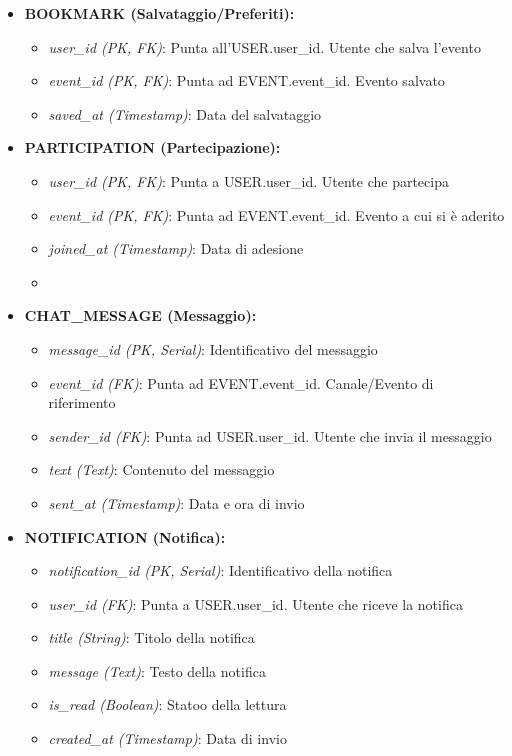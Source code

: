 \begin{itemize}[nosep, leftmargin=*]
        \item \textbf{BOOKMARK (Salvataggio/Preferiti):}
        \begin{itemize}
            \item \textit{user\_id (PK, FK)}: Punta all'USER.user\_id. Utente che salva l'evento
            \item \textit{event\_id (PK, FK)}: Punta ad EVENT.event\_id. Evento salvato
            \item \textit{saved\_at (Timestamp)}: Data del salvataggio
        \end{itemize}

        \item \textbf{PARTICIPATION (Partecipazione):}
        \begin{itemize}
            \item \textit{user\_id (PK, FK)}: Punta a USER.user\_id. Utente che partecipa
            \item \textit{event\_id (PK, FK)}: Punta ad EVENT.event\_id. Evento a cui si è aderito
            \item \textit{joined\_at (Timestamp)}: Data di adesione
            \item \textbf{}
        \end{itemize}

        \item \textbf{CHAT\_MESSAGE (Messaggio):}
        \begin{itemize}
            \item \textit{message\_id (PK, Serial)}: Identificativo del messaggio
            \item \textit{event\_id (FK)}: Punta ad EVENT.event\_id. Canale/Evento di riferimento
            \item \textit{sender\_id (FK)}: Punta ad USER.user\_id. Utente che invia il messaggio
            \item \textit{text (Text)}: Contenuto del messaggio
            \item \textit{sent\_at (Timestamp)}: Data e ora di invio
        \end{itemize}

        \item \textbf{NOTIFICATION (Notifica):}
        \begin{itemize}
            \item \textit{notification\_id (PK, Serial)}: Identificativo della notifica
            \item \textit{user\_id (FK)}: Punta a USER.user\_id. Utente che riceve la notifica
            \item \textit{title (String)}: Titolo della notifica
            \item \textit{message (Text)}: Testo della notifica
            \item \textit{is\_read (Boolean)}: Statoo della lettura
            \item \textit{created\_at (Timestamp)}: Data di invio
        \end{itemize}
        
    \end{itemize}
    
